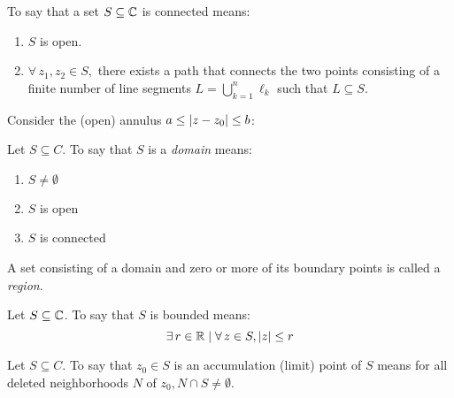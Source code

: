\documentclass[letterpaper,12pt,fleqn]{article}
\begin{document}
\begin{definition}
  To say that a set $S\subseteq\mathbb{C}$ is connected means:
  \begin{enumerate}
  \item $S$ is open.
  \item $\forall\,z_1,z_2\in S,$ there exists a path that connects the two
    points consisting of a finite number of line segments
    $L=\bigcup_{k=1}^n\ell_k$ such that $L\subseteq S$.
  \end{enumerate}
\end{definition}

\begin{example}
  Consider the (open) annulus $a\le\lvert z-z_0\rvert\le b$:

  \bigskip
  
  \begin{figure}[h]
    \setlength{\leftskip}{1in}
  \end{figure}
\end{example}

\begin{definition}
  Let $S\subseteq C$. To say that $S$ is a \emph{domain} means:
  \begin{enumerate}
  \item $S\ne\emptyset$
  \item $S$ is open
  \item $S$ is connected
  \end{enumerate}

  A set consisting of a domain and zero or more of its boundary points is
  called a \emph{region}.
\end{definition}

\begin{definition}
  Let $S\subseteq\mathbb{C}$. To say that $S$ is bounded means:
  \[\exists\,r\in\mathbb{R}\mid\forall\,z\in S,\lvert z\rvert\le r\]
\end{definition}
\newpage
\begin{definition}
  Let $S\subseteq C$. To say that $z_0\in S$ is an accumulation (limit) point
  of $S$ means for all deleted neighborhoods $N$ of $z_0, N\cap S\ne\emptyset$.
\end{definition}
\end{document}
